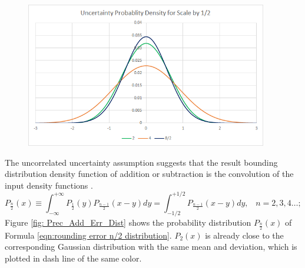 \documentclass[twoside]{article}
\numberwithin{equation}{section}
\newcommand{\eqspace}{\;\;\;}
\begin{document}
\begin{figure}[p]
\centering
\includegraphics[height=2.5in]{Prec_RndByDev_Dist.png} 
\label{fig: Prec_RndByDev_Dist}
\end{figure}




The uncorrelated uncertainty assumption suggests that the result bounding distribution density function of addition or subtraction is the convolution of the input density functions \cite{Probability_Statistics}.  
\begin{equation}
\label{eqn:rounding error n/2 distribution}
P_{\frac{n}{2}}(x) \equiv \int _{-\infty}^{+\infty}P_{\frac{1}{2}}(y)P_{\frac{n-1}{2}}(x-y)dy=\int _{-1/2}^{+1/2}P_{\frac{n-1}{2}}(x-y) dy,\eqspace n=2,3,4\dots;
\end{equation}
Figure \ref{fig: Prec_Add_Err_Dist} shows the probability distribution $P_{\frac{n}{2}}(x)$ of Formula \eqref{eqn:rounding error n/2 distribution}.  
$P_{2}(x)$ is already close to the corresponding Gaussian distribution with the same mean and deviation, which is plotted in dash line of the same color.
\end{document}
